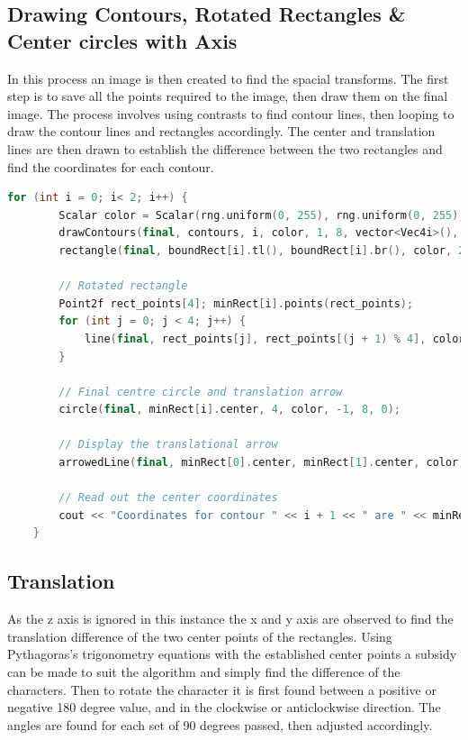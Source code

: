 \documentclass[a4paper, 10pt]{article}
\begin{document}

\subsection{Drawing Contours, Rotated Rectangles \& Center circles with Axis}

In this process an image is then created to find the spacial transforms. The first step is to save all the points required to the image, then draw them on the final image. The process involves using contrasts to find contour lines, then looping to draw the contour lines and rectangles accordingly. The center and translation lines are then drawn to establish the difference between the two rectangles and find the coordinates for each contour.

\begin{lstlisting}[language = C++]
	for (int i = 0; i< 2; i++) {
		Scalar color = Scalar(rng.uniform(0, 255), rng.uniform(0, 255), rng.uniform(0, 255));
		drawContours(final, contours, i, color, 1, 8, vector<Vec4i>(), 0, Point());
		rectangle(final, boundRect[i].tl(), boundRect[i].br(), color, 2, 8, 0);

		// Rotated rectangle
		Point2f rect_points[4]; minRect[i].points(rect_points);
		for (int j = 0; j < 4; j++) {
			line(final, rect_points[j], rect_points[(j + 1) % 4], color, 1, 8);
		}
		
		// Final centre circle and translation arrow
		circle(final, minRect[i].center, 4, color, -1, 8, 0);
		
		// Display the translational arrow
		arrowedLine(final, minRect[0].center, minRect[1].center, color, 1, 8);
		
		// Read out the center coordinates
		cout << "Coordinates for contour " << i + 1 << " are " << minRect[i].center << endl;
	}
\end{lstlisting}


\subsection{Translation}

As the z axis is ignored in this instance the x and y axis are observed to find the translation difference of the two center points of the rectangles. Using Pythagoras's trigonometry equations with the established center points a subsidy can be made to suit the algorithm and simply find the difference of the characters. Then to rotate the character it is first found between a positive or negative 180 degree value, and in the clockwise or anticlockwise direction. The angles are found for each set of 90 degrees passed, then adjusted accordingly.
\end{document}
